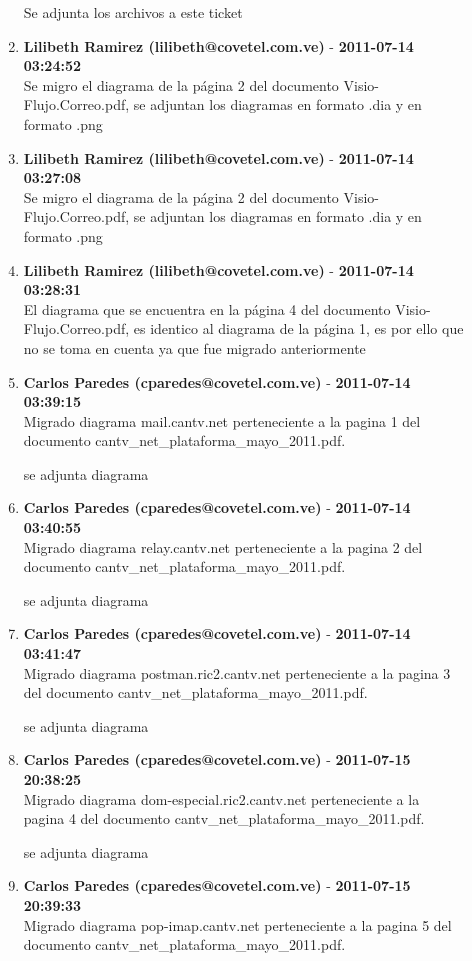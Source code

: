 \begin{description}
\begin{enumerate}
Se adjunta los archivos a este ticket        \item {\bfseries Lilibeth Ramirez (lilibeth@covetel.com.ve)  } - {\bfseries 2011-07-14 03:24:52} \\ Se migro el diagrama de la página 2 del documento Visio-Flujo.Correo.pdf, se
adjuntan los diagramas en formato .dia y en formato .png        \item {\bfseries Lilibeth Ramirez (lilibeth@covetel.com.ve)  } - {\bfseries 2011-07-14 03:27:08} \\ Se migro el diagrama de la página 2 del documento Visio-Flujo.Correo.pdf, se
adjuntan los diagramas en formato .dia y en formato .png        \item {\bfseries Lilibeth Ramirez (lilibeth@covetel.com.ve)  } - {\bfseries 2011-07-14 03:28:31} \\ El diagrama que se encuentra en la página 4 del documento
Visio-Flujo.Correo.pdf, es identico al diagrama de la página 1, es por ello que
no se toma en cuenta ya que fue migrado anteriormente        \item {\bfseries Carlos Paredes (cparedes@covetel.com.ve)  } - {\bfseries 2011-07-14 03:39:15} \\ Migrado diagrama mail.cantv.net perteneciente a la pagina 1 del documento
cantv_net_plataforma_mayo_2011.pdf.

se adjunta diagrama        \item {\bfseries Carlos Paredes (cparedes@covetel.com.ve)  } - {\bfseries 2011-07-14 03:40:55} \\ Migrado diagrama relay.cantv.net perteneciente a la pagina 2 del documento
cantv_net_plataforma_mayo_2011.pdf.

se adjunta diagrama        \item {\bfseries Carlos Paredes (cparedes@covetel.com.ve)  } - {\bfseries 2011-07-14 03:41:47} \\ Migrado diagrama postman.ric2.cantv.net perteneciente a la pagina 3 del
documento cantv_net_plataforma_mayo_2011.pdf.

se adjunta diagrama        \item {\bfseries Carlos Paredes (cparedes@covetel.com.ve)  } - {\bfseries 2011-07-15 20:38:25} \\ Migrado diagrama dom-especial.ric2.cantv.net perteneciente a la pagina 4 del
documento cantv_net_plataforma_mayo_2011.pdf.

se adjunta diagrama        \item {\bfseries Carlos Paredes (cparedes@covetel.com.ve)  } - {\bfseries 2011-07-15 20:39:33} \\ Migrado diagrama pop-imap.cantv.net perteneciente a la pagina 5 del documento
cantv_net_plataforma_mayo_2011.pdf.


\end{enumerate}
\end{description}
